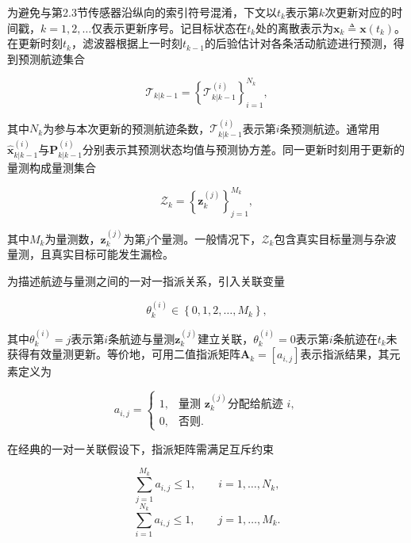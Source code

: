 \documentclass{xdupgthesis}
\begin{document}
为避免与第2.3节传感器沿纵向的索引符号混淆，下文以$t_k$表示第$k$次更新对应的时间戳，$k=1,2,\ldots$仅表示更新序号。记目标状态在$t_k$处的离散表示为$\mathbf{x}_k \triangleq \mathbf{x}(t_k)$。在更新时刻$t_k$，滤波器根据上一时刻$t_{k-1}$的后验估计对各条活动航迹进行预测，得到预测航迹集合

\begin{equation}
	\mathcal{T}_{k|k-1}=\left\{\mathcal{T}^{(i)}_{k|k-1}\right\}_{i=1}^{N_k},
\end{equation}

其中$N_k$为参与本次更新的预测航迹条数，$\mathcal{T}^{(i)}_{k|k-1}$表示第$i$条预测航迹。通常用$\hat{\mathbf{x}}^{(i)}_{k|k-1}$与$\mathbf{P}^{(i)}_{k|k-1}$分别表示其预测状态均值与预测协方差。同一更新时刻用于更新的量测构成量测集合

\begin{equation}
	\mathcal{Z}_k=\left\{\mathbf{z}^{(j)}_k\right\}_{j=1}^{M_k},
\end{equation}

其中$M_k$为量测数，$\mathbf{z}^{(j)}_k$为第$j$个量测。一般情况下，$\mathcal{Z}_k$包含真实目标量测与杂波量测，且真实目标可能发生漏检。

为描述航迹与量测之间的一对一指派关系，引入关联变量

\begin{equation}
	\theta_k^{(i)}\in\left\{0,1,2,\ldots,M_k\right\},
\end{equation}

其中$\theta_k^{(i)}=j$表示第$i$条航迹与量测$\mathbf{z}^{(j)}_k$建立关联，$\theta_k^{(i)}=0$表示第$i$条航迹在$t_k$未获得有效量测更新。等价地，可用二值指派矩阵$\mathbf{A}_k=[a_{i,j}]$表示指派结果，其元素定义为

\begin{equation}
	a_{i,j}=
	\begin{cases}
		1, & \text{量测 }\mathbf{z}^{(j)}_k \text{分配给航迹 } i,\\
		0, & \text{否则}.
	\end{cases}
\end{equation}

在经典的一对一关联假设下，指派矩阵需满足互斥约束

\begin{equation}
	\sum_{j=1}^{M_k} a_{i,j}\le 1,\qquad i=1,\ldots,N_k,
\end{equation}
\begin{equation}
	\sum_{i=1}^{N_k} a_{i,j}\le 1,\qquad j=1,\ldots,M_k.
\end{equation}
\end{document}
